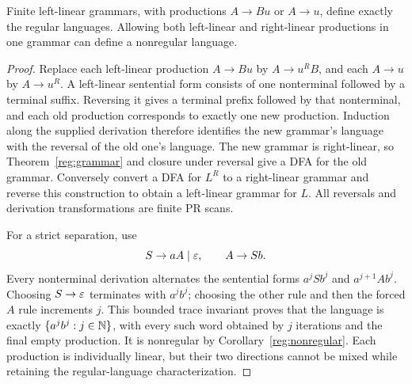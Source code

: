 \begin{proposition}
\label{mon:leftlinear}
Finite left-linear grammars, with productions $A\to Bu$ or $A\to u$,
define exactly the regular languages. Allowing both left-linear and
right-linear productions in one grammar can define a nonregular language.
\end{proposition}
\begin{proof}
Replace each left-linear production $A\to Bu$ by $A\to u^RB$, and each
$A\to u$ by $A\to u^R$. A left-linear sentential form consists of one
nonterminal followed by a terminal suffix. Reversing it gives a terminal
prefix followed by that nonterminal, and each old production corresponds
to exactly one new production. Induction along the supplied derivation
therefore identifies the new grammar's language with the reversal of the
old one's language. The new grammar is right-linear, so
Theorem~\ref{reg:grammar} and closure under reversal give a DFA for the
old grammar. Conversely convert a DFA for $L^R$ to a right-linear grammar
and reverse this construction to obtain a left-linear grammar for $L$.
All reversals and derivation transformations are finite PR scans.

For a strict separation, use
\[
 S\to aA\mid\varepsilon,\qquad A\to Sb.
\]
Every nonterminal derivation alternates the sentential forms
$a^jSb^j$ and $a^{j+1}Ab^j$. Choosing $S\to\varepsilon$ terminates with
$a^jb^j$; choosing the other rule and then the forced $A$ rule increments
$j$. This bounded trace invariant proves that the language is exactly
$\{a^jb^j:j\in\mathbb N\}$, with every such word obtained by $j$ iterations
and the final empty production. It is nonregular by
Corollary~\ref{reg:nonregular}. Each production is individually linear,
but their two directions cannot be mixed while retaining the regular-language
characterization.
\end{proof}
